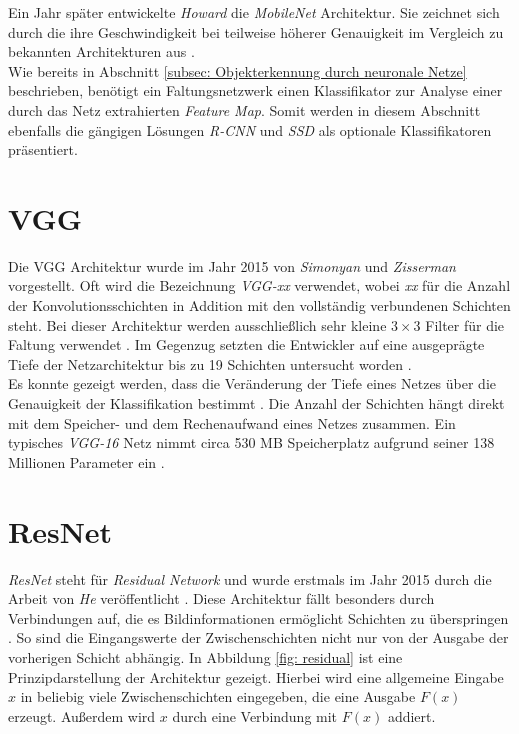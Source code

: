 		Ein Jahr später entwickelte \textit{Howard} \cite{mobilenets} die \textit{MobileNet} Architektur. Sie zeichnet sich durch die ihre Geschwindigkeit bei teilweise höherer Genauigkeit im Vergleich zu bekannten Architekturen aus \cite{mobilenets}.\\
		
		Wie bereits in Abschnitt \ref{subsec: Objekterkennung durch neuronale Netze} beschrieben, benötigt ein Faltungsnetzwerk einen Klassifikator zur Analyse einer durch das Netz extrahierten \textit{Feature Map}. Somit werden in diesem Abschnitt ebenfalls die gängigen Lösungen \textit{R-CNN} und \textit{SSD} als optionale Klassifikatoren präsentiert.
		
		\section*{VGG}
		\label{subsec: vgg}
		Die VGG Architektur wurde im Jahr 2015 von \textit{Simonyan} und \textit{Zisserman} \cite{vgg} vorgestellt. Oft wird die Bezeichnung \textit{VGG-xx} verwendet, wobei \textit{xx} für die Anzahl der Konvolutionsschichten in Addition mit den vollständig verbundenen Schichten steht. Bei dieser Architektur werden ausschließlich sehr kleine $3 \times 3$ Filter für die Faltung verwendet \cite{vgg}. Im Gegenzug setzten die Entwickler auf eine ausgeprägte Tiefe der Netzarchitektur bis zu 19 Schichten untersucht worden \cite{vgg}.\\
		
		Es konnte gezeigt werden, dass die Veränderung der Tiefe eines Netzes über die Genauigkeit der Klassifikation bestimmt \cite{vgg}. Die Anzahl der Schichten hängt direkt mit dem Speicher- und dem Rechenaufwand eines Netzes zusammen. Ein typisches \textit{VGG-16} Netz nimmt circa 530 MB Speicherplatz aufgrund seiner 138 Millionen Parameter ein \cite{keras}.\\
		
		\section*{ResNet}
		\label{subsec: resnet}
		\textit{ResNet} steht für \textit{Residual Network} und wurde erstmals im Jahr 2015 durch die Arbeit von \textit{He} veröffentlicht \cite{resnet}. Diese Architektur fällt besonders durch Verbindungen auf, die es Bildinformationen ermöglicht Schichten zu überspringen \cite{resnet}. So sind die Eingangswerte der Zwischenschichten nicht nur von der Ausgabe der vorherigen Schicht abhängig. In Abbildung \ref{fig: residual} ist eine Prinzipdarstellung der Architektur gezeigt. Hierbei wird eine allgemeine Eingabe $x$ in beliebig viele Zwischenschichten eingegeben, die eine Ausgabe $F(x)$ erzeugt. Außerdem wird $x$ durch eine Verbindung mit $F(x)$ addiert.
		
